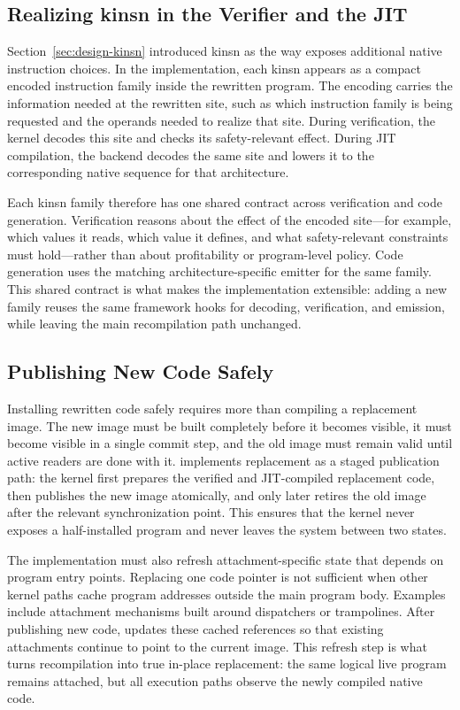 \subsection{Realizing kinsn in the Verifier and the JIT}
\label{sec:impl-kinsn}

Section~\ref{sec:design-kinsn} introduced kinsn as the way \tool exposes additional native instruction choices. In the implementation, each kinsn appears as a compact encoded instruction family inside the rewritten program. The encoding carries the information needed at the rewritten site, such as which instruction family is being requested and the operands needed to realize that site. During verification, the kernel decodes this site and checks its safety-relevant effect. During JIT compilation, the backend decodes the same site and lowers it to the corresponding native sequence for that architecture.

Each kinsn family therefore has one shared contract across verification and code generation. Verification reasons about the effect of the encoded site---for example, which values it reads, which value it defines, and what safety-relevant constraints must hold---rather than about profitability or program-level policy. Code generation uses the matching architecture-specific emitter for the same family. This shared contract is what makes the implementation extensible: adding a new family reuses the same framework hooks for decoding, verification, and emission, while leaving the main recompilation path unchanged.

\subsection{Publishing New Code Safely}
\label{sec:impl-publish}

Installing rewritten code safely requires more than compiling a replacement image. The new image must be built completely before it becomes visible, it must become visible in a single commit step, and the old image must remain valid until active readers are done with it. \tool implements replacement as a staged publication path: the kernel first prepares the verified and JIT-compiled replacement code, then publishes the new image atomically, and only later retires the old image after the relevant synchronization point. This ensures that the kernel never exposes a half-installed program and never leaves the system between two states.

The implementation must also refresh attachment-specific state that depends on program entry points. Replacing one code pointer is not sufficient when other kernel paths cache program addresses outside the main program body. Examples include attachment mechanisms built around dispatchers or trampolines. After publishing new code, \tool updates these cached references so that existing attachments continue to point to the current image. This refresh step is what turns recompilation into true in-place replacement: the same logical live program remains attached, but all execution paths observe the newly compiled native code.

